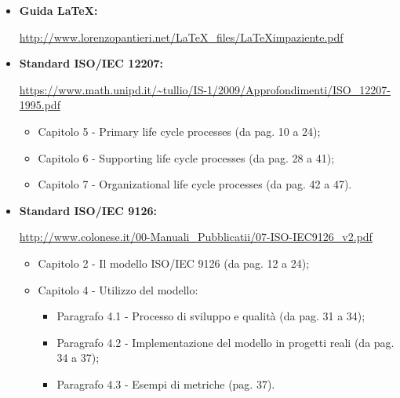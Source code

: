 \begin {itemize}
\begin{itemize}
          \begin{itemize}
              \item Paragrafo 25.1 - Version management (da pag. 735 a 740);
              \item Paragrafo 25.2 - System building (da pag. 740 a 745).
          \end{itemize}
\end{itemize}
\item \textbf{Guida \LaTeX:}
\begin{center}
    \url{http://www.lorenzopantieri.net/LaTeX_files/LaTeXimpaziente.pdf}
\end{center}
\item \textbf{Standard ISO/IEC 12207:}
\begin{center}
    \url{https://www.math.unipd.it/~tullio/IS-1/2009/Approfondimenti/ISO_12207-1995.pdf}
    \begin{itemize}
        \item Capitolo 5 - Primary life cycle processes (da pag. 10 a 24);
        \item Capitolo 6 - Supporting life cycle processes (da pag. 28 a 41);
        \item Capitolo 7 - Organizational life cycle processes (da pag. 42 a 47).
    \end{itemize}
\end{center}
\item \textbf{Standard ISO/IEC 9126:}
\begin{center}
    \url{http://www.colonese.it/00-Manuali_Pubblicatii/07-ISO-IEC9126_v2.pdf}
    \begin{itemize}
        \item Capitolo 2 - Il modello ISO/IEC 9126 (da pag. 12 a 24);
        \item Capitolo 4 - Utilizzo del modello:
              \begin{itemize}
                  \item Paragrafo 4.1 - Processo di sviluppo e qualità (da pag. 31 a 34);
                  \item Paragrafo 4.2 - Implementazione del modello in progetti reali (da pag. 34 a 37);
                  \item Paragrafo 4.3 - Esempi di metriche (pag. 37).
              \end{itemize}
    \end{itemize}

\end{center}
\end{itemize}